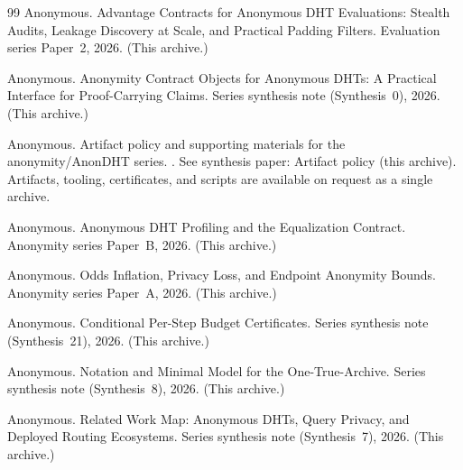 \documentclass[11pt]{article}
\begin{document}
\begin{thebibliography}{99}
Anonymous.
\newblock Advantage Contracts for Anonymous DHT Evaluations: Stealth Audits, Leakage Discovery at Scale, and Practical Padding Filters.
\newblock Evaluation series Paper~2, 2026. (This archive.)

Anonymous.
\newblock Anonymity Contract Objects for Anonymous DHTs: A Practical Interface for Proof-Carrying Claims.
\newblock Series synthesis note (Synthesis~0), 2026. (This archive.)

Anonymous.
\newblock Artifact policy and supporting materials for the anonymity/AnonDHT series.
.
\newblock See synthesis paper: Artifact policy (this archive). Artifacts, tooling, certificates, and scripts are available on request as a single archive.

Anonymous.
\newblock Anonymous {DHT} Profiling and the Equalization Contract.
\newblock Anonymity series Paper~B, 2026. (This archive.)


Anonymous.
\newblock Odds Inflation, Privacy Loss, and Endpoint Anonymity Bounds.
\newblock Anonymity series Paper~A, 2026. (This archive.)

Anonymous.
\newblock Conditional Per-Step Budget Certificates.
\newblock Series synthesis note (Synthesis~21), 2026. (This archive.)

Anonymous.
\newblock Notation and Minimal Model for the One-True-Archive.
\newblock Series synthesis note (Synthesis~8), 2026. (This archive.)

Anonymous.
\newblock Related Work Map: Anonymous {DHT}s, Query Privacy, and Deployed Routing Ecosystems.
\newblock Series synthesis note (Synthesis~7), 2026. (This archive.)

\end{thebibliography}
\end{document}
